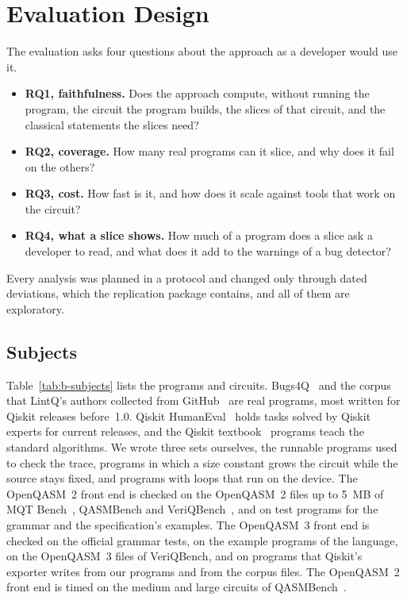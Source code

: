 \section{Evaluation Design}\label{sec:b-design}

The evaluation asks four questions about the approach as a developer would use it.
\begin{itemize}
\item \textbf{RQ1, faithfulness.} Does the approach compute, without running the program, the circuit the program
builds, the slices of that circuit, and the classical statements the slices need?
\item \textbf{RQ2, coverage.} How many real programs can it slice, and why does it fail on the others?
\item \textbf{RQ3, cost.} How fast is it, and how does it scale against tools that work on the circuit?
\item \textbf{RQ4, what a slice shows.} How much of a program does a slice ask a developer to read, and what does it add
to the warnings of a bug detector?
\end{itemize}
Every analysis was planned in a protocol and changed only through dated deviations, which the replication package
contains, and all of them are exploratory.

\subsection{Subjects}
Table~\ref{tab:b-subjects} lists the programs and circuits. Bugs4Q~\cite{zhao2023bugs4q} and the corpus that LintQ's
authors collected from GitHub~\cite{paltenghi2024lintq} are real programs, most written for Qiskit releases before~1.0.
Qiskit HumanEval~\cite{vishwakarma2024qhe} holds tasks solved by Qiskit experts for current releases, and the Qiskit
textbook~\cite{qiskittextbook} programs teach the standard algorithms. We wrote three sets ourselves, the
\numToolDevPrograms{} runnable programs used to check the trace, programs in which a size constant grows the circuit
while the source stays fixed, and programs with loops that run on the device. The OpenQASM~2 front end is checked on
the \numSmlChecked{} OpenQASM~2 files up to 5~MB of MQT Bench~\cite{quetschlich2023mqt}, QASMBench and
VeriQBench~\cite{chen2022veriqbench}, and on test programs for the grammar and the specification's examples. The OpenQASM~3 front end is checked on the
official grammar tests, on the \numQthreeExamples{} example programs of the language, on the OpenQASM~3 files of
VeriQBench, and on programs that Qiskit's exporter writes from our programs and from the corpus files. The OpenQASM~2
front end is timed on the medium and large circuits of QASMBench~\cite{li2023qasmbench}.


